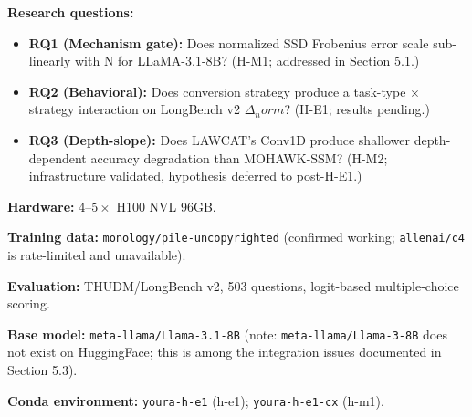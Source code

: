 
\textbf{Research questions:}

\begin{itemize}
\item \textbf{RQ1 (Mechanism gate):} Does normalized SSD Frobenius error scale sub-linearly with N for LLaMA-3.1-8B? (H-M1; addressed in Section 5.1.)
\item \textbf{RQ2 (Behavioral):} Does conversion strategy produce a task-type $\times$ strategy interaction on LongBench v2 $\Delta _norm$? (H-E1; results pending.)
\item \textbf{RQ3 (Depth-slope):} Does LAWCAT's Conv1D produce shallower depth-dependent accuracy degradation than MOHAWK-SSM? (H-M2; infrastructure validated, hypothesis deferred to post-H-E1.)
\end{itemize}

\textbf{Hardware:} 4--$5\times$ H100 NVL 96GB.

\textbf{Training data:} \texttt{monology/pile-uncopyrighted} (confirmed working; \texttt{allenai/c4} is rate-limited and unavailable).

\textbf{Evaluation:} THUDM/LongBench v2, 503 questions, logit-based multiple-choice scoring.

\textbf{Base model:} \texttt{meta-llama/Llama-3.1-8B} (note: \texttt{meta-llama/Llama-3-8B} does not exist on HuggingFace; this is among the integration issues documented in Section 5.3).

\textbf{Conda environment:} \texttt{youra-h-e1} (h-e1); \texttt{youra-h-e1-cx} (h-m1).

